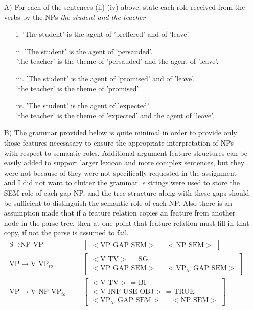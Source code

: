 \documentclass{article}
\begin{document}
\begin{enumerate}
\item[A)] For each of the sentences (ii)-(iv) above, state each role received from the verbs by the NPs \textit{the student and the teacher}
\begin{enumerate}
\item[i.] 'The student' is the agent of 'preffered' and of 'leave'.
\item[ii.] 'The student' is the agent of 'persauded'.\\'the teacher' is the theme of 'persauded' and the agent of 'leave'.
\item[iii.] 'The student' is the agent of 'promised' and of 'leave'.\\'the teacher' is the theme of 'promised'.
\item[iv.] 'The student' is the agent of 'expected'.\\'the teacher' is the theme of 'expected' and the agent of 'leave'.
\end{enumerate}
\item[B)] The grammar provided below is quite minimal in order to provide only those features necesasary to ensure the appropriate interpretation of NPs with respect to semantic roles. Additional argument feature structures can be easily added to support larger lexicon and more complex sentences, but they were not because of they were not specifically requested in the assignment and I did not want to clutter the grammar. $\epsilon$ strings were used to store the SEM role of each gap NP, and the tree structure along with these gaps should be sufficient to distinguish the semantic role of each NP. Also there is an assumption made that if a feature relation copies an feature from another node in the parse tree, then at one point that feature relation must fill in that copy, if not the parse is assumed to fail.
\begin{align*}	
\text{S} \rightarrow \text{NP VP}  & & & \left  [ \begin{array}{c} <\text{VP GAP SEM}>\text{ = }<\text{NP SEM}> \end{array} \right ] \\
\text{VP} \rightarrow \text{V VP}_{to} &  & & \left  [ \begin{array}{c} <\text{V TV}>\text{ = } \text{SG} \\ <\text{VP GAP SEM}>\text{ = } <\text{VP}_{to} \text{ GAP SEM}> \end{array} \right ] \\
\text{VP} \rightarrow \text{V NP VP}_{to} & & & \left  [ \begin{array}{c} <\text{V TV}>\text{ = } \text{BI} \\ <\text{V INF-USE-OBJ}>\text{ = } \text{TRUE} \\ <\text{VP}_{to} \text{ GAP SEM}> \text{ = } <\text{NP SEM}> \end{array} \right ] \\

\end{align*}
\end{enumerate}
\end{document}
